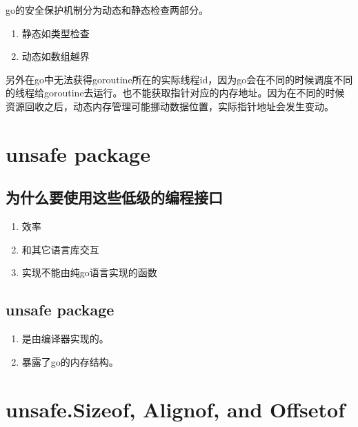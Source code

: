 go的安全保护机制分为动态和静态检查两部分。

\begin{enumerate}
\tightlist
\item
  静态如类型检查
\item
  动态如数组越界
\end{enumerate}

另外在go中无法获得goroutine所在的实际线程id，因为go会在不同的时候调度不同的线程给goroutine去运行。也不能获取指针对应的内存地址。因为在不同的时候资源回收之后，动态内存管理可能挪动数据位置，实际指针地址会发生变动。

\hypertarget{unsafe-package}{%
\section{unsafe package}\label{unsafe-package}}

\hypertarget{ux4e3aux4ec0ux4e48ux8981ux4f7fux7528ux8fd9ux4e9bux4f4eux7ea7ux7684ux7f16ux7a0bux63a5ux53e3}{%
\subsection{为什么要使用这些低级的编程接口}\label{ux4e3aux4ec0ux4e48ux8981ux4f7fux7528ux8fd9ux4e9bux4f4eux7ea7ux7684ux7f16ux7a0bux63a5ux53e3}}

\begin{enumerate}
\tightlist
\item
  效率
\item
  和其它语言库交互
\item
  实现不能由纯go语言实现的函数
\end{enumerate}

\hypertarget{unsafe-package-1}{%
\subsection{unsafe package}\label{unsafe-package-1}}

\begin{enumerate}
\tightlist
\item
  是由编译器实现的。
\item
  暴露了go的内存结构。
\end{enumerate}

\hypertarget{unsafe.sizeof-alignof-and-offsetof}{%
\section{unsafe.Sizeof, Alignof, and
Offsetof}\label{unsafe.sizeof-alignof-and-offsetof}}

